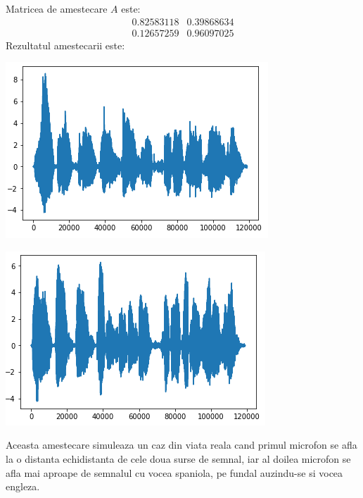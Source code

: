\documentclass[12pt,oneside]{article}
\begin{document}
 Matricea de amestecare $A$ este: 
\[
 \begin{matrix}
	0.82583118 & 0.39868634 \\
	0.12657259 & 0.96097025
 \end{matrix}
\]
Rezultatul amestecarii este:
\begin{center}
	\includegraphics[scale=1]{speech_mixed_1}
 \end{center}
\begin{center}
	\includegraphics[scale=1]{speech_mixed_2}
 \end{center}

 Aceasta amestecare simuleaza un caz din viata reala cand primul microfon se afla la o distanta echidistanta de cele doua surse de semnal, iar al doilea microfon se afla mai aproape de semnalul cu vocea spaniola, pe fundal auzindu-se si vocea engleza.
\end{document}
